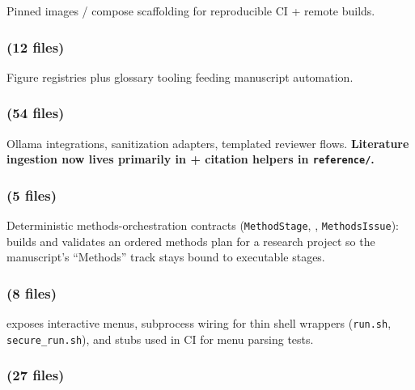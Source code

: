 \documentclass[
]{article}
\begin{document}
Pinned images / compose scaffolding for reproducible CI + remote builds.

\subsubsection{\texorpdfstring{ (12
files)}{infrastructure.documentation (12 files)}}\label{infrastructure.documentation-12-files}

Figure registries plus glossary tooling feeding manuscript automation.

\subsubsection{\texorpdfstring{ (54
files)}{infrastructure.llm (54 files)}}\label{infrastructure.llm-54-files}

Ollama integrations, sanitization adapters, templated reviewer flows.
\textbf{Literature ingestion now lives primarily in
 + citation helpers in \texttt{reference/}.}

\subsubsection{\texorpdfstring{ (5
files)}{infrastructure.methods (5 files)}}\label{infrastructure.methods-5-files}

Deterministic methods-orchestration contracts (\texttt{MethodStage},
, \texttt{MethodsIssue}): builds and
validates an ordered methods plan for a research project so the
manuscript's ``Methods'' track stays bound to executable stages.

\subsubsection{\texorpdfstring{ (8
files)}{infrastructure.orchestration (8 files)}}\label{infrastructure.orchestration-8-files}

 exposes interactive
menus, subprocess wiring for thin shell wrappers (\texttt{run.sh},
\texttt{secure\_run.sh}), and stubs used in CI for menu parsing tests.

\subsubsection{\texorpdfstring{ (27
files)}{infrastructure.project (27 files)}}\label{infrastructure.project-27-files}
\end{document}
